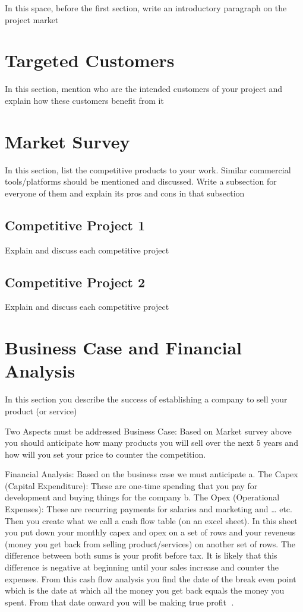 In this space, before the first section, write an introductory paragraph on the project market

\section{Targeted Customers}
In this section, mention who are the intended customers of your project and explain how these customers benefit from it

\section{Market Survey}
In this section, list the competitive products to your work. Similar commercial tools/platforms should be mentioned and discussed. Write a subsection for everyone of them and explain its pros and cons in that subsection

\subsection{Competitive Project 1}
Explain and discuss each competitive project

\subsection{Competitive Project 2}
Explain and discuss each competitive project

\section{Business Case and Financial Analysis }

In this section you describe the success of establishing a company to sell your product (or service) 

Two Aspects must be addressed
Business Case:   Based on Market survey above you should anticipate how many products you will sell over the next 5 years and how will you set your price to counter the competition.

Financial Analysis: Based on the business case we must anticipate 
    a. The Capex (Capital Expenditure):  These are one-time spending that you pay for development and buying things for the company
    b. The Opex (Operational Expenses): These are recurring payments for salaries and marketing and … etc.
Then you create what we call a cash flow table (on an excel sheet). In this sheet you put down your monthly capex and opex on a set of rows and your reveneus (money you get back from selling product/services) on another set of rows.
The difference between both sums is your profit before tax.
It is likely that this difference is negative at beginning until your sales increase and counter the expenses.
From this cash flow analysis you find the date of the break even point wbich is the date at which all the money you get back equals the money you spent. From that date onward you will be making true profit .
